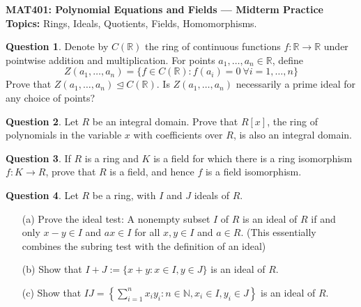 \documentclass[11pt]{article}
\def\mbb{\mathbb}
\def\R{\mbb{R}}
\def\N{\mbb{N}}
\def\vs{\vspace{5mm}}
\theoremstyle{pink}
\theoremstyle{boxedsolution}
\theoremstyle{definition}
\newtheorem{question}{Question}
\theoremstyle{claim}
\begin{document}
\thispagestyle{empty}

\begin{framed}
    \begin{center}
        \large\textbf{MAT401: Polynomial Equations and Fields --- Midterm Practice} \vspace{3mm}\\
        \textbf{Topics:} Rings, Ideals, Quotients, Fields, Homomorphisms.
    \end{center}
\end{framed}

\vs

\begin{question}
Denote by $C(\R)$ the ring of continuous functions $f:\R \to \R$ under pointwise addition and multiplication. For points $a_1, \dots, a_n \in \R$, define 
\[
Z(a_1, \dots, a_n) = \{f \in C(\R): f(a_i) = 0 \ \forall i = 1, \dots, n\}
\]
Prove that $Z(a_1, \dots, a_n) \trianglelefteq C(\R)$. Is $Z(a_1, \dots, a_n)$ necessarily a prime ideal for any choice of points? 
\end{question}

\begin{question}
Let $R$ be an integral domain. Prove that $R[x]$, the ring of polynomials in the variable $x$ with coefficients over $R$, is also an integral domain.
\end{question}


\begin{question}
If $R$ is a ring and $K$ is a field for which there is a ring isomorphism $f: K \to R$, prove that $R$ is a field, and hence $f$ is a field isomorphism.
\end{question}

\begin{question}
Let $R$ be a ring, with $I$ and $J$ ideals of $R$. 
\begin{enumerate}
    \item[(a)] Prove the ideal test: A nonempty subset $I$ of $R$ is an ideal of $R$ if and only $x - y \in I$ and $ax\in I$ for all $x,y \in I$ and $a \in R$. (This essentially combines the subring test with the definition of an ideal)
    
    \item[(b)] Show that $I + J := \{x+y: x \in I, y \in J\}$ is an ideal of $R$.
    
    \item[(c)] Show that $IJ = \left\{ \sum_{i=1}^n x_iy_i: n \in \N, x_i \in I, y_i \in J \right\}$ is an ideal of $R$.
\end{enumerate}
\end{question}
\end{document}
